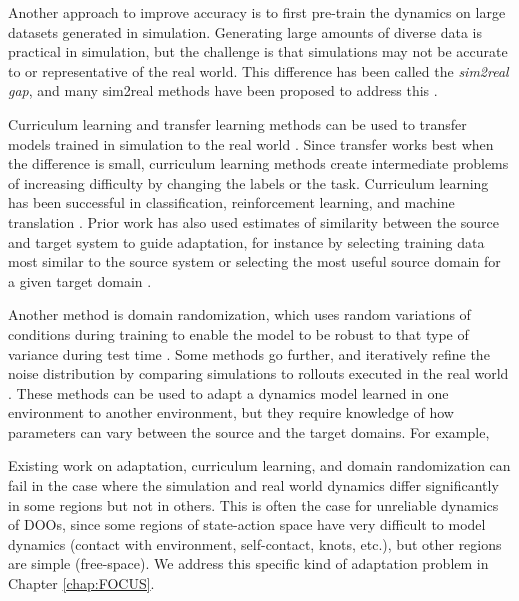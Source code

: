 Another approach to improve accuracy is to first pre-train the dynamics on large datasets generated in simulation. Generating large amounts of diverse data is practical in simulation, but the challenge is that simulations may not be accurate to or representative of the real world. This difference has been called the \textit{sim2real gap}, and many sim2real methods have been proposed to address this \cite{sim2realDynamics2018,sim2realDynamics2018,PushSim2021,real2sim2real,sim2real2sim}.

Curriculum learning and transfer learning methods can be used to transfer models trained in simulation to the real world \cite{curriculumBengio09,sorocky2020experience, torrey2010transfer}. Since transfer works best when the difference is small, curriculum learning methods create intermediate problems of increasing difficulty by changing the labels or the task. Curriculum learning has been successful in classification, reinforcement learning, and machine translation \cite{gradualAdaptation20, zhang2017curriculum, zhan2021meta, curriculumDeepRL20}. Prior work has also used estimates of similarity between the source and target system to guide adaptation, for instance by selecting training data most similar to the source system \cite{sorocky2020experience} or selecting the most useful source domain for a given target domain \cite{courchesne2021onassessing}.

Another method is domain randomization, which uses random variations of conditions during training to enable the model to be robust to that type of variance during test time \cite{lowrey2018reinforcement}. Some methods go further, and iteratively refine the noise distribution by comparing simulations to rollouts executed in the real world \cite{chebotar2019closing, langsfeld2018selection}. These methods can be used to adapt a dynamics model learned in one environment to another environment, but they require knowledge of how parameters can vary between the source and the target domains. For example, 

Existing work on adaptation, curriculum learning, and domain randomization can fail in the case where the simulation and real world dynamics differ significantly in some regions but not in others. This is often the case for unreliable dynamics of DOOs, since some regions of state-action space have very difficult to model dynamics (contact with environment, self-contact, knots, etc.), but other regions are simple (free-space). We address this specific kind of adaptation problem in Chapter \ref{chap:FOCUS}.

